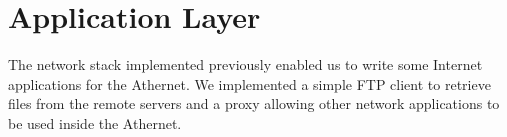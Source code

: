 \section{Application Layer}
The network stack implemented previously enabled us to write some Internet applications for the Athernet. We implemented a simple FTP client to retrieve files from the remote servers and a proxy allowing other network applications to be used inside the Athernet.
